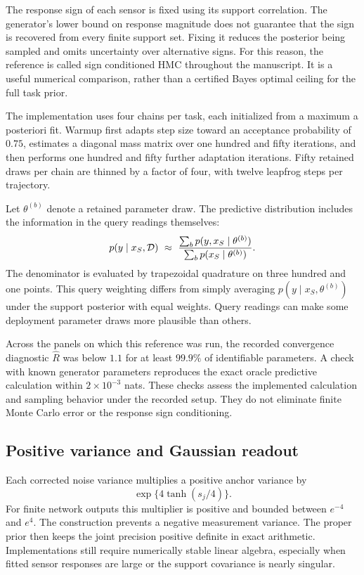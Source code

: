 The response sign of each sensor is fixed using its support correlation. The generator's lower bound on response magnitude does not guarantee that the sign is recovered from every finite support set. Fixing it reduces the posterior being sampled and omits uncertainty over alternative signs. For this reason, the reference is called sign conditioned HMC throughout the manuscript. It is a useful numerical comparison, rather than a certified Bayes optimal ceiling for the full task prior.

The implementation uses four chains per task, each initialized from a maximum a posteriori fit. Warmup first adapts step size toward an acceptance probability of \(0.75\), estimates a diagonal mass matrix over one hundred and fifty iterations, and then performs one hundred and fifty further adaptation iterations. Fifty retained draws per chain are thinned by a factor of four, with twelve leapfrog steps per trajectory.

Let \(\theta^{(b)}\) denote a retained parameter draw. The predictive distribution includes the information in the query readings themselves:
\begin{equation}
 p(y\mid x_S,\mathcal{D})
 \ \approx\
 \frac{\sum_b p(y,x_S\mid\theta^{(b)})}
 {\sum_b p(x_S\mid\theta^{(b)})}.
 \label{eq:hmc-predictive}
\end{equation}
The denominator is evaluated by trapezoidal quadrature on three hundred and one points. This query weighting differs from simply averaging \(p(y\mid x_S,\theta^{(b)})\) under the support posterior with equal weights. Query readings can make some deployment parameter draws more plausible than others.

Across the panels on which this reference was run, the recorded convergence diagnostic \(\widehat R\) was below \(1.1\) for at least \(99.9\%\) of identifiable parameters. A check with known generator parameters reproduces the exact oracle predictive calculation within \(2\times10^{-3}\) nats. These checks assess the implemented calculation and sampling behavior under the recorded setup. They do not eliminate finite Monte Carlo error or the response sign conditioning.

\subsection{Positive variance and Gaussian readout}

Each corrected noise variance multiplies a positive anchor variance by
\begin{equation}
 \exp\{4\tanh(s_j/4)\}.
\end{equation}
For finite network outputs this multiplier is positive and bounded between \(e^{-4}\) and \(e^4\). The construction prevents a negative measurement variance. The proper prior then keeps the joint precision positive definite in exact arithmetic. Implementations still require numerically stable linear algebra, especially when fitted sensor responses are large or the support covariance is nearly singular.

